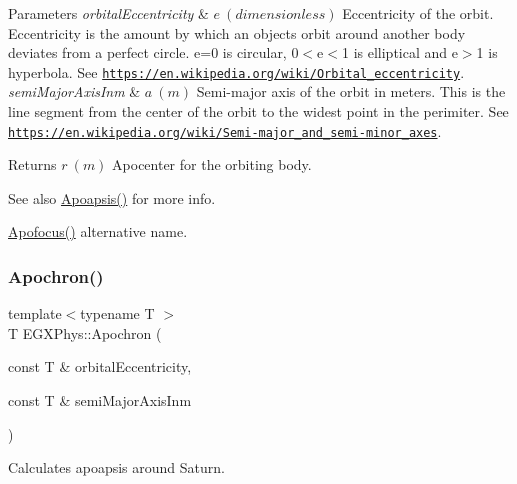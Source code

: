 \begin{DoxyParams}{Parameters}
{\em orbital\+Eccentricity} & $ e\ (dimensionless)$ Eccentricity of the orbit. Eccentricity is the amount by which an objects orbit around another body deviates from a perfect circle. e=0 is circular, 0$<$e$<$1 is elliptical and e$>$1 is hyperbola. See \href{https://en.wikipedia.org/wiki/Orbital_eccentricity}{\tt https\+://en.\+wikipedia.\+org/wiki/\+Orbital\+\_\+eccentricity}. \\
\hline
{\em semi\+Major\+Axis\+Inm} & $ a\ (m)$ Semi-\/major axis of the orbit in meters. This is the line segment from the center of the orbit to the widest point in the perimiter. See \href{https://en.wikipedia.org/wiki/Semi-major_and_semi-minor_axes}{\tt https\+://en.\+wikipedia.\+org/wiki/\+Semi-\/major\+\_\+and\+\_\+semi-\/minor\+\_\+axes}. \\
\hline
\end{DoxyParams}
\begin{DoxyReturn}{Returns}
$ r\ (m)$ Apocenter for the orbiting body. 
\end{DoxyReturn}
\begin{DoxySeeAlso}{See also}
\mbox{\hyperlink{group___e_g_x_phys-_apoapsis_gafd08a2d1d64886e7bb9bcb7ff65bc3ea}{Apoapsis()}} for more info. 

\mbox{\hyperlink{group___e_g_x_phys-_apoapsis_gada28ef9258703e9e32ac9e564544ae87}{Apofocus()}} alternative name. 
\end{DoxySeeAlso}
\mbox{\label{group___e_g_x_phys-_apoapsis_gac978de20a08121198f73637018c80eee}} 
\subsubsection{\texorpdfstring{Apochron()}{Apochron()}}
{\footnotesize\ttfamily template$<$typename T $>$ \\
T E\+G\+X\+Phys\+::\+Apochron (\begin{DoxyParamCaption}\item[{const T \&}]{orbital\+Eccentricity,  }\item[{const T \&}]{semi\+Major\+Axis\+Inm }\end{DoxyParamCaption})}



Calculates apoapsis around Saturn. 


